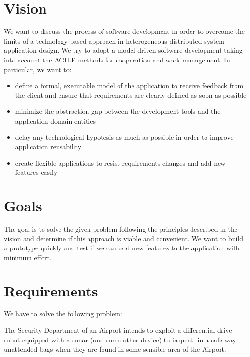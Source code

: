\documentclass{llncs}
\newcommand{\labelsec}[1]{\label{sec:#1}}
\begin{document}
\section{Vision}
\labelsec{Vision}
We want to discuss the process of software development in order to overcome the limits of a technology-based approach in heterogeneous distributed system application design.
We try to adopt a model-driven software development taking into account the AGILE methods for cooperation and work management.
In particular, we want to:
\begin{itemize}
\item define a formal, executable model of the application to receive feedback from the client and ensure that requirements are clearly defined as soon as possible 
\item minimize the abstraction gap between the development tools and the application domain entities
\item delay any technological hypotesis as much as possible in order to improve application reusability
\item create flexible applications to resist requirements changes and add new features easily
\end{itemize}
\section{Goals}
\labelsec{Goals}
The goal is to solve the given problem following the principles described in the vision and determine if this approach is viable and convenient. We want to build a prototype quickly and test if we can add new features to the application with minimum effort.
\section{Requirements}
\labelsec{Requirements}
We have to solve the following problem:

The Security Department of an Airport intends to exploit a differential drive robot equipped with a sonar (and some other device) to inspect -in a safe way- unattended bags when they are found in some sensible area of the Airport.
 
\end{document}
